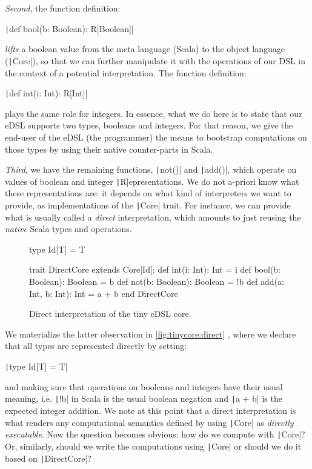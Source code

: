 \documentclass[11pt]{article}
\renewcommand{\vref}[1]{\autoref{#1} \vpageref{#1}}{}
\newcommand{\ScalaI}[1]{\texttt|#1|}
\newcommand{\FirstEtcX}[1]{\marginpar{\faCube{ \smaller #1}}\xspace}
\newcommand{\FirstEtc}{\FirstEtcX{}}
\begin{document}
\textit{Second}\FirstEtc, the function definition:

\par\ScalaI{def bool(b: Boolean): R[Boolean]}

\noindent\textit{lifts} a boolean value from the meta language (Scala) to the object language (\ScalaI{Core}), so that we can further manipulate it with the operations of our DSL in the context of a potential interpretation. The function definition:

\par\ScalaI{def int(i: Int): R[Int]}

\noindent plays the same role for integers. In essence, what we do here is to state that our eDSL supports two types, booleans and integers. For that reason, we give the end-user of the eDSL (the programmer) the means to bootstrap computations on those types by using their native counter-parts in Scala. 

\textit{Third}\FirstEtc, we have the remaining functions, \ScalaI{not()} and \ScalaI{add()}, which operate on values of boolean and integer \ScalaI{R}epresentations. We do not a-priori know what these representations are: it depends on what kind of interpreters we want to provide, as implementations of the \ScalaI{Core} trait. For instance, we can provide what is usually called a \textit{direct} interpretation, which amounts to just reusing the \textit{native} Scala types and operations. 

\begin{figure}[t]
\begin{ScalaBlock}
type Id[T] = T

trait DirectCore extends Core[Id]:
  def int(i: Int): Int = i
  def bool(b: Boolean): Boolean = b
  def not(b: Boolean): Boolean = !b
  def add(a: Int, b: Int): Int = a + b
end DirectCore
\end{ScalaBlock}
\caption{Direct interpretation of the tiny eDSL core.}
\label{fig:tinycore:direct}
\hrulefill
\end{figure}

We materialize the latter observation in \vref{fig:tinycore:direct}, where we declare that all types are represented directly by setting:

\par\ScalaI{type Id[T] = T}

\noindent and making sure that operations on booleans and integers have their usual meaning, i.e. \ScalaI{!b} in Scala is the usual boolean negation and \ScalaI{a + b} is the expected integer addition. We note at this point that a direct interpretation is what renders any computational semantics defined by using \ScalaI{Core} as \textit{directly executable}. 
Now the question becomes obvious: how do we compute with \ScalaI{Core}? Or, similarly, should we write the computations using \ScalaI{Core} or should we do it based on \ScalaI{DirectCore}?
\end{document}
